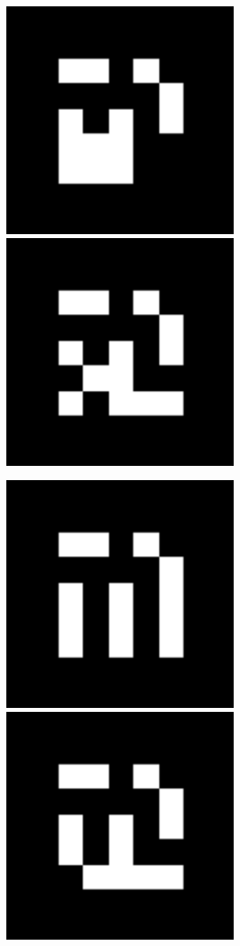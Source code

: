 \documentclass[10pt,letterpaper]{article}
\begin{document}
\includegraphics[width=3in]{MarkerData_121.png}
\includegraphics[width=3in]{MarkerData_122.png}


\includegraphics[width=3in]{MarkerData_123.png}
\includegraphics[width=3in]{MarkerData_124.png}
\end{document}
